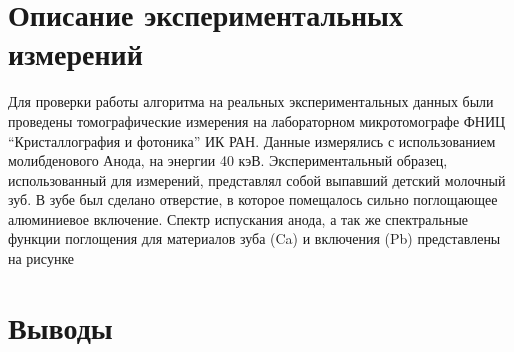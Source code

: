 \section{Описание экспериментальных измерений}
Для проверки работы алгоритма на реальных экспериментальных данных были проведены томографические измерения на лабораторном микротомографе ФНИЦ ``Кристаллография и фотоника'' ИК РАН.
Данные измерялись с использованием молибденового Анода, на энергии 40 кэВ.
Экспериментальный образец, использованный для измерений, представлял собой выпавший детский молочный зуб.
В зубе был сделано отверстие, в которое помещалось сильно поглощающее алюминиевое включение.
Спектр испускания анода, а так же спектральные функции поглощения для материалов зуба (Ca) и включения (Pb) представлены на рисунке 


\section{Выводы}
